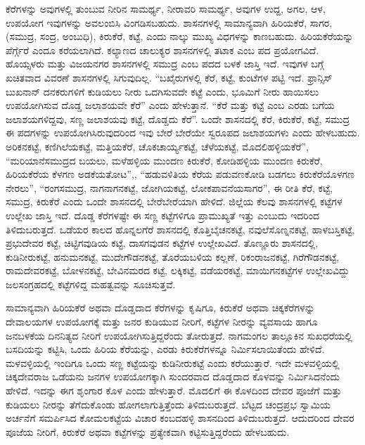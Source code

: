 ಕೆರೆಗಳನ್ನು ಅವುಗಳಲ್ಲಿ ತುಂಬುವ ನೀರಿನ ಸಾಮರ್ಥ್ಯ, ನೀರಾವರಿ ಸಾಮರ್ಥ್ಯ, ಅವುಗಳ ಉದ್ದ, ಅಗಲ, ಆಳ, ಉಪಯೋಗ ಇವುಗಳನ್ನು ಅವಲಂಬಿಸಿ ವಿಂಗಡಿಸಬಹುದು. ಶಾಸನಗಳಲ್ಲಿ ಸಾಮಾನ್ಯವಾಗಿ ಹಿರಿಯಕೆರೆ, ಸಾಗರ, (ಸಮುದ್ರ, ಸಂದ್ರ, ಅಂಬುಧಿ), ಕಿರುಕೆರೆ, ಕಟ್ಟೆ, ಎಂದು ನಾಲ್ಕು ಮುಖ್ಯ ವಿಧಗಳನ್ನು ಕಾಣಬಹುದು. ಹಿರಿಯಕೆರೆಯನ್ನು ಪೆರ್ಗ್ಗೆರೆ ಎಂದೂ ಕರೆಯಲಾಗಿದೆ. ಕಲ್ಯಾಣದ ಚಾಲುಕ್ಯರ ಶಾಸನಗಳಲ್ಲಿ ತಟಾಕ ಎಂಬ ಪದ ಪ್ರಯೋಗವಿದೆ. ಹೊಯ್ಸಳರು ಮತ್ತು ವಿಜಯನಗರ ಶಾಸನಗಳಲ್ಲಿ ಸಮುದ್ರ ಎಂಬ ಪದದ ಬಳಕೆ ಜಾಸ್ತಿ ಇದೆ. ಇವುಗಳ ಬಗ್ಗೆ ಖಚಿತವಾದ ವಿವರಣೆ ಶಾಸನಗಳಲ್ಲಿ ಸಿಗುವುದಿಲ್ಲ. “ಬಖೈರುಗಳಲ್ಲಿ ಕೆರೆ, ಕಟ್ಟೆ, ಕುಂಟೆಗಳ ಪಟ್ಟಿ ಇದೆ. ಫ್ರಾನ್ಸಿಸ್​ ಬುಖನಾನ್​ ದನಕರುಗಳಿಗೆ ಕುಡಿಯಲು ನೀರು ಒದಗಿಸುವದೇ ಕಟ್ಟೆ ಎಂದು, ಭೂಮಿಗೆ ನೀರು ಹಾಯಿಸಲು ಉಪಯೋಗಿಸುವ ದೊಡ್ಡ ಜಲಾಶಯವೇ ಕೆರೆ” ಎಂದು ಹೇಳುತ್ತಾನೆ. “ಕೆರೆ ಮತ್ತು ಕಟ್ಟೆ ಎಂಬ ಎರಡು ಬಗೆಯ ಜಲಾಶಯಗಳಿದ್ದವು, ಸಣ್ಣ ಜಲಾಶಯವು ಕಟ್ಟೆ, ದೊಡ್ಡದು ಕೆರೆ”. ಒಂದೇ ಶಾಸನದಲ್ಲಿ ಕೆರೆ, ಕಿರುಕೆರೆ, ಕಟ್ಟೆ, ಸಮುದ್ರ ಈ ಪದಗಳನ್ನು ಉಪಯೋಗಿಸಿರುವುದರಿಂದ ಇವು ಬೇರೆ ಬೇರೆಯೇ ಸ್ವರೂಪದ ಜಲಾಶಯಗಳು ಎಂದು ಹೇಳಬಹುದು. ಅರಿಕನಕಟ್ಟೆ, ಕಣಿಗಿಲೆಯಕಟ್ಟೆ, ಮತ್ತಿಯಕೆರೆ, ಚೊಕಚಾರ್ಯ್ಯಕಟ್ಟೆ, ಚೆಳೆಯಕಟ್ಟೆ, ಮೊದಲಿಹಳ್ಳಿಯಕೆರೆ”, “ಮರಿಯಾನೆಸಮುದ್ರದ ಬಯಲು, ಮಳೆಹಳ್ಳಿಯ ಮುಂದಣ ಕಿರುಕೆರೆ, ಕೋಡಿಹಳ್ಳಿಯ ಮುಂದಣ ಕಿರುಕೆರೆ, ಹಿರಿಯಕೆರೆಯ ಕೆಳಗಣ ಅಡಕೆಯತೋಟ”,, “ಹಡುವಳಿತಿಯ ಕೆರೆಯ ಪಡುವಣಕೋಡಿ ಬಡಗಲು ಕಿರುಕೆರೆಯೊಳಗಣ ನೇರಲು”, “ರಂಗಸಮುದ್ರ, ನಾಗನಾಗನಕಟ್ಟೆ, ಜೋಗಿಯಕಟ್ಟೆ, ಲೋಕಪಾವನೆಯಸಾಗರ”, ಈ ರೀತಿ ಕೆರೆ, ಕಟ್ಟೆ, ಸಮುದ್ರ, ಕಿರುಕೆರೆ ಎಂದು ಒಂದೇ ಶಾಸನದಲ್ಲಿ ಬೇರೆಬೇರೆಯಾಗಿ ಹೇಳಿದೆ. ಜಿಲ್ಲೆಯ ಕೆಲವು ಶಾಸನಗಳಲ್ಲಿ ಕಟ್ಟೆಗಳ ಉಲ್ಲೇಖ ಜಾಸ್ತಿ ಇದೆ. ದೊಡ್ಡ ಕೆರೆಗಳಷ್ಟೇ ಈ ಸಣ್ಣ ಕಟ್ಟೆಗಳಿಗೂ ಪ್ರಾಮುಖ್ಯತೆ ಇತ್ತು ಎಂಬುದು ಇದರಿಂದ ತಿಳಿದುಬರುತ್ತದೆ. ಒಡೆಯರ ಕಾಲದ ಹೊನ್ನಲಗೆರೆ ಶಾಸನದಲ್ಲಿ ಕೊತ್ತಿಬೈಚನಕಟ್ಟೆ, ನವುಲೆಸೊಣ್ನನಕಟ್ಟೆ, ಹಾಳಬಸ್ತಿಕಟ್ಟೆ, ಪ್ರಭುದೇವರ ಕಟ್ಟೆ, ಚಿಟ್ಟಿಗವುಡಿಯ ಕಟ್ಟೆ, ದಾಸಗವುಡನ ಕಟ್ಟೆಗಳ ಉಲ್ಲೇಖವಿದೆ. ತೊಣ್ಣೂರು ಶಾಸನದಲ್ಲಿ, ಕುಡಿನೀರುಕಟ್ಟೆ, ಹನುಮನಕಟ್ಟೆ, ಮುದೇಗೌಡನಕಟ್ಟೆ, ತೊರೆಯಬಳಿಯ ಕಲ್ಲಣೆ, ರಿಕಂರಾಜನಕಟ್ಟೆ, ಗಿರೆಗೌಡನಕಟ್ಟೆ, ರಾಮದೇವರಕಟ್ಟೆ, ಬೋಳನಕಟ್ಟೆ, ಬೇವಿನಮರದ ಕಟ್ಟೆ, ಲಕ್ಕಿಕಟ್ಟೆ, ವಡೆಯರಕಟ್ಟೆ, ಮಾಯಿಗನಕಟ್ಟೆಗಳ ಉಲ್ಲೇಖವಿದ್ದು ಜಲಸಂಗ್ರಹದಲ್ಲಿ ಕಟ್ಟೆಗಳಿದ್ದ ಮಹತ್ವವನ್ನು ಸೂಚಿಸುತ್ತವೆ.

ಸಾಮಾನ್ಯವಾಗಿ ಹಿರಿಯಕೆರೆ ಅಥವಾ ದೊಡ್ಡದಾದ ಕೆರೆಗಳನ್ನು ಕೃಷಿಗೂ, ಕಿರುಕೆರೆ ಅಥವಾ ಚಿಕ್ಕಕೆರೆಗಳನ್ನು ದೇವಾಲಯಗಳ ಉಪಯೋಗಕ್ಕೆ ಮತ್ತು ಜನರ ಕುಡಿಯುವ ನೀರಿಗೆ, ಕಟ್ಟೆಗಳ ನೀರನ್ನು ವ್ಯವಸಾಯ ಹಾಗೂ ಜನಬಳಕೆಯ ದಿನನಿತ್ಯದ ನೀರಿಗೆ ಉಪಯೋಗಿಸುತ್ತಿದ್ದರೆಂದು ತೋರುತ್ತದೆ. ನಾಗಮಂಗಲ ತಾಲ್ಲೂಕಿನ ಸುಖಧರೆಯಲ್ಲಿ ಬಸದಿಯನ್ನು ಕಟ್ಟಿಸಿ, ಒಂದು ಹಿರಿಯ ಕೆರೆಯನ್ನು, ಎರಡು ಕಿರುಕೆರೆಗಳನ್ನೂ ನಿರ್ಮಿಸಲಾಯಿತೆಂದು ಹೇಳಿದೆ. ಮಳವಳ್ಳಿಯಲ್ಲಿ ಇಂದಿಗೂ ಒಂದು ಸಣ್ಣ ಕಟ್ಟೆಯನ್ನು ಕುಡಿನೀರುಕಟ್ಟೆ ಎಂದು ಕರೆಯುತ್ತಾರೆ. ಇದೇ ಮಳವಳ್ಳಿಯಲ್ಲಿ ಚಿಕ್ಕದೇವರಾಜ ಒಡೆಯನು ಜನಗಳ ಉಪಯೋಗಕ್ಕಾಗಿ ಸುಂದರವಾದ ದೊಡ್ಡದಾದ ಕೊಳವನ್ನು ನಿರ್ಮಿಸಿದನೆಂದು ಹೇಳಿದೆ. ಇದನ್ನು ಈಗ ಶೃಂಗಾರ ಕೊಳ ಎಂದು ಹೇಳುತ್ತಾರೆ. ಮೊದಲಿಗೆ ಈ ಕೊಳದಿಂದ ದೇವರ ಪೂಜೆಗೆ ಮತ್ತು ಕುಡಿಯಲು ನೀರನ್ನು ತೆಗೆದುಕೊಂಡು ಹೋಗಲಾಗುತ್ತಿತ್ತೆಂದು ತಿಳಿದುಬರುತ್ತದೆ. ಬೆಟ್ಟದ ಚಂದ್ರಪ್ರಭ ಸ್ವಾಮಿಯ ಅರ್ಚನೆಗೆ ಸಮರ್ಪಿಸಿದ ಕೋಮಲಕಟ್ಟೆಯ ವಿಚಾರ ಕಂಬದಹಳ್ಳಿ ಶಾಸನದಿಂದ ತಿಳಿದುಬರುತ್ತದೆ. ಆದುದರಿಂದ ದೇವರ ಪೂಜೆಯ ನೀರಿಗೆ, ಕಿರುಕೆರೆ ಅಥವಾ ಕಟ್ಟೆಗಳನ್ನು ಪ್ರತ್ಯೇಕವಾಗಿ ಕಟ್ಟಿಸುತ್ತಿದ್ದರೆಂದು ಹೇಳಬಹುದು.

